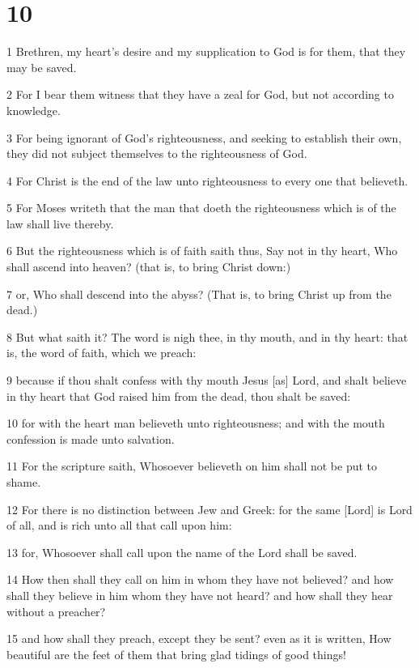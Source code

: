 \chapter{10}

\par 1 Brethren, my heart's desire and my supplication to God is for them, that they may be saved.
\par 2 For I bear them witness that they have a zeal for God, but not according to knowledge.
\par 3 For being ignorant of God's righteousness, and seeking to establish their own, they did not subject themselves to the righteousness of God.
\par 4 For Christ is the end of the law unto righteousness to every one that believeth.
\par 5 For Moses writeth that the man that doeth the righteousness which is of the law shall live thereby.
\par 6 But the righteousness which is of faith saith thus, Say not in thy heart, Who shall ascend into heaven? (that is, to bring Christ down:)
\par 7 or, Who shall descend into the abyss? (That is, to bring Christ up from the dead.)
\par 8 But what saith it? The word is nigh thee, in thy mouth, and in thy heart: that is, the word of faith, which we preach:
\par 9 because if thou shalt confess with thy mouth Jesus [as] Lord, and shalt believe in thy heart that God raised him from the dead, thou shalt be saved:
\par 10 for with the heart man believeth unto righteousness; and with the mouth confession is made unto salvation.
\par 11 For the scripture saith, Whosoever believeth on him shall not be put to shame.
\par 12 For there is no distinction between Jew and Greek: for the same [Lord] is Lord of all, and is rich unto all that call upon him:
\par 13 for, Whosoever shall call upon the name of the Lord shall be saved.
\par 14 How then shall they call on him in whom they have not believed? and how shall they believe in him whom they have not heard? and how shall they hear without a preacher?
\par 15 and how shall they preach, except they be sent? even as it is written, How beautiful are the feet of them that bring glad tidings of good things!
